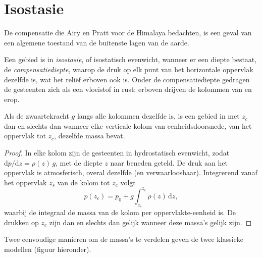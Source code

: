 \section{Isostasie}

De compensatie die Airy en Pratt voor de Himalaya bedachten, is een geval van een algemene toestand van de buitenste lagen van de aarde.

\begin{definition}\label{def:b1:isostasy-gravity:isostasy}
Een gebied is in \emph{isostasie}, of isostatisch evenwicht, wanneer er een diepte bestaat, de \emph{compensatiediepte}, waarop de druk op elk punt van het horizontale oppervlak dezelfde is, wat het reliëf erboven ook is. Onder de compensatiediepte gedragen de gesteenten zich als een vloeistof in rust; erboven drijven de kolommen van  en  erop.
\end{definition}

\begin{proposition}\label{prop:b1:isostasy-gravity:equal-mass}
Als de zwaartekracht $g$ langs alle kolommen dezelfde is, is een gebied in  met  $z_c$ dan en slechts dan wanneer elke verticale kolom van eenheidsdoorsnede, van het oppervlak tot $z_c$, dezelfde massa bevat.
\end{proposition}

\begin{proof}
In elke kolom zijn de gesteenten in hydrostatisch evenwicht, zodat
$\mathrm dp/\mathrm dz = \rho(z)\,g$, met de diepte $z$ naar beneden geteld. De druk aan het oppervlak is atmosferisch, overal dezelfde (en verwaarloosbaar).
Integrerend vanaf het oppervlak $z_s$ van de kolom tot $z_c$ volgt
\[
  p(z_c) = p_0 + g\int_{z_s}^{z_c}\rho(z)\,\mathrm dz ,
\]
waarbij de integraal de massa van de kolom per oppervlakte-eenheid is. De drukken op
$z_c$ zijn dan en slechts dan gelijk wanneer deze massa's gelijk zijn.
\end{proof}

Twee eenvoudige manieren om de massa's te verdelen geven de twee klassieke modellen (figuur hieronder).

